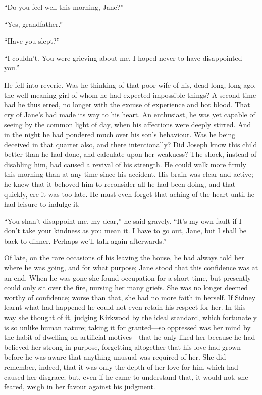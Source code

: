 ``Do you feel well this morning, Jane?''

``Yes, grandfather.''

``Have you slept?''

``I couldn't. You were grieving about me. I hoped never to have
disappointed you.''

He fell into reverie. Was he thinking of that poor wife of his, dead
long, long ago, the well-meaning girl of whom he had expected impossible
things? A second time had he thus erred, no longer with the excuse of
{}experience and hot blood. That cry of Jane's had made its way to his
heart. An enthusiast, he was yet capable of seeing by the common light
of day, when his affections were deeply stirred. And in the night he had
pondered much over his son's behaviour. Was he being deceived in that
quarter also, and there intentionally? Did Joseph know this child better
than he had done, and calculate upon her weakuess? The shock, instead of
disabling him, had caused a revival of his strength. He could walk more
firmly this morning than at any time since his accident. His brain was
clear and active; he knew that it behoved him to reconsider all he had
been doing, and that quickly, ere it was too late. He must even forget
that aching of the heart until he had leisure to indulge it.

``You shan't disappoint me, my dear,'' he said gravely. ``It's my own
fault if I don't take your kindness as you mean it. I have to go out,
Jane, but I shall be back to dinner. Perhaps we'll talk again
afterwards.''

Of late, on the rare occasions of his leaving the house, he had always
told her where he was going, and for what purpose; Jane {}stood that
this confidence was at an end. When he was gone she found occupation for
a short time, but presently could only sit over the fire, nursing her
many griefs. She was no longer deemed worthy of confidence; worse than
that, she had no more faith in herself. If Sidney learnt what had
happened he could not even retain his respect for her. In this way she
thought of it, judging Kirkwood by the ideal standard, which fortunately
is so unlike human nature; taking it for granted---so oppressed was her
mind by the habit of dwelling on artificial motives---that he only liked
her because he had believed her strong in purpose, forgetting altogether
that his love had grown before he was aware that anything unusual was
required of her. She did remember, indeed, that it was only the depth of
her love for him which had caused her disgrace; but, even if he came to
understand that, it would not, she feared, weigh in her favour against
his judgment.

